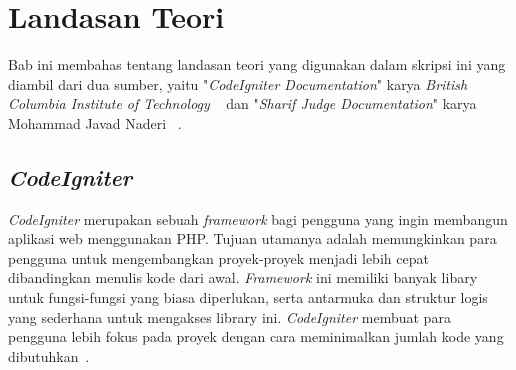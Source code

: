 \chapter{Landasan Teori}
\label{chap:teori}

Bab ini membahas tentang landasan teori yang digunakan dalam skripsi ini yang diambil dari dua sumber, yaitu "\textit{CodeIgniter Documentation}" karya \textit{British Columbia Institute of Technology} ~\cite{bcit:17:cidoc} dan "\textit{Sharif Judge Documentation}" karya Mohammad Javad Naderi ~\cite{mjnaderi:14:sharifjudgedoc}.

\section{\textit{CodeIgniter}}
\label{sec:codeigniter} 
 
\textit{CodeIgniter} merupakan sebuah \textit{framework} bagi pengguna yang ingin membangun aplikasi web menggunakan PHP. Tujuan utamanya adalah memungkinkan para pengguna untuk mengembangkan proyek-proyek menjadi lebih cepat dibandingkan menulis kode dari awal. \textit{Framework} ini memiliki banyak libary untuk fungsi-fungsi yang biasa diperlukan, serta antarmuka dan struktur logis yang sederhana untuk mengakses library ini. \textit{CodeIgniter} membuat para pengguna lebih fokus pada proyek dengan cara meminimalkan jumlah kode yang dibutuhkan~\cite{bcit:17:cidoc}. \\

